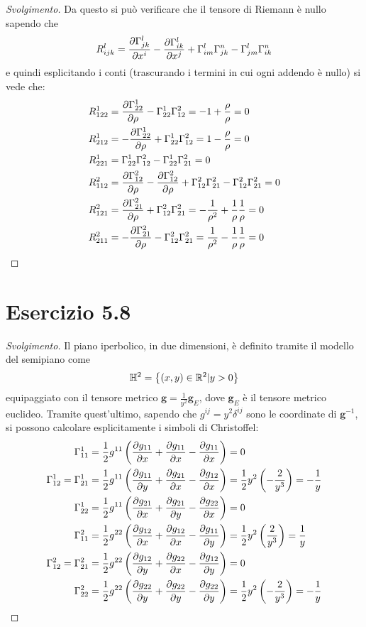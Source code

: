 \documentclass[italian,a4paper,10pt]{article}
\begin{document}
\begin{proof}[Svolgimento]
Da questo si può verificare che il tensore di Riemann è nullo sapendo che $$R_{ijk}^l = \pdv{\Gamma^l_{jk}}{x^i} - \pdv{\Gamma^l_{ik}}{x^j} + \Gamma^l_{im}\Gamma^n_{jk} - \Gamma^l_{jm}\Gamma^n_{ik}$$ e quindi esplicitando i conti (trascurando i termini in cui ogni addendo è nullo) si vede che:
\begin{align*}
R^1_{122} &= \pdv{\Gamma^1_{22}}{\rho} - \Gamma^1_{22}\Gamma^2_{12}= -1+\frac{\rho}{\rho}=0\\
R^1_{212} &= -\pdv{\Gamma^1_{22}}{\rho} + \Gamma^1_{22}\Gamma^2_{12}= 1-\frac{\rho}{\rho}=0\\
R^1_{221} &= \Gamma^1_{22}\Gamma^2_{12} - \Gamma^1_{22}\Gamma^2_{21} = 0\\
R^2_{112} &= \pdv{\Gamma^2_{12}}{\rho} - \pdv{\Gamma^2_{12}}{\rho} + \Gamma^2_{12}\Gamma^2_{21} -\Gamma^2_{12}\Gamma^2_{21} = 0\\
R^2_{121} &= \pdv{\Gamma^2_{21}}{\rho} + \Gamma^2_{12}\Gamma^2_{21}= -\frac{1}{\rho^2}+\frac{1}{\rho}\frac{1}{\rho}=0\\
R^2_{211} &= -\pdv{\Gamma^2_{21}}{\rho} - \Gamma^2_{12}\Gamma^2_{21}= \frac{1}{\rho^2}-\frac{1}{\rho}\frac{1}{\rho}=0
\end{align*}
\end{proof}

\section*{Esercizio 5.8}
\begin{proof}[Svolgimento]
Il piano iperbolico, in due dimensioni, è definito tramite il modello del semipiano come $$\mathbb H^2 = \left\lbrace (x,y)\in \mathbb R^2 | y>0 \right\rbrace $$ equipaggiato con il tensore metrico $\bm{g} = \frac{1}{y^2}\bm{g}_E$, dove $\bm{g}_E$ è il tensore metrico euclideo.
Tramite quest'ultimo, sapendo che $g^{ij}=y^2\delta^{ij}$ sono le coordinate di $\bm{g}^{-1}$, si possono calcolare esplicitamente i simboli di Christoffel:
\begin{align*}
\Gamma^1_{11} &= \frac12g^{11}\left(\pdv{g_{11}}{x}+\pdv{g_{11}}{x}-\pdv{g_{11}}{x}\right)=0\\
\Gamma^1_{12} = \Gamma^1_{21} &= \frac12g^{11}\left(\pdv{g_{11}}{y}+\pdv{g_{21}}{x}-\pdv{g_{12}}{x}\right)= \frac12y^2\left(-\frac{2}{y^3}\right)=-\frac1y\\ 
\Gamma^1_{22} &= \frac12g^{11}\left(\pdv{g_{21}}{x}+\pdv{g_{21}}{y}-\pdv{g_{22}}{x}\right)=0\\
\Gamma^2_{11} &= \frac12g^{22}\left(\pdv{g_{12}}{x}+\pdv{g_{12}}{x}-\pdv{g_{11}}{y}\right)=\frac12y^2\left(\frac{2}{y^3}\right)=\frac1y\\
\Gamma^2_{12} = \Gamma^2_{21} &= \frac12g^{22}\left(\pdv{g_{12}}{y}+\pdv{g_{22}}{x}-\pdv{g_{12}}{y}\right)=0\\
\Gamma^2_{22} &= \frac12g^{22}\left(\pdv{g_{22}}{y}+\pdv{g_{22}}{y}-\pdv{g_{22}}{y}\right)=\frac12y^2\left(-\frac{2}{y^3}\right)=-\frac1y\\
\end{align*}
\end{proof}
\end{document}
